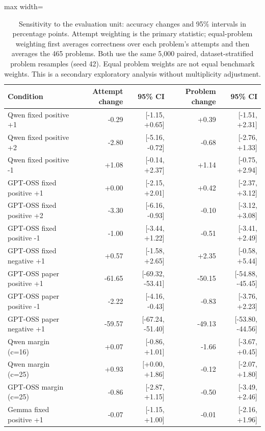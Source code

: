 \documentclass[12pt,a4paper,twoside,openright]{book}
\begin{document}
\begin{table}[!ht]
\centering\small
\caption{Sensitivity to the evaluation unit: accuracy changes and 95\% intervals in percentage points. Attempt weighting is the primary statistic; equal-problem weighting first averages correctness over each problem's attempts and then averages the 465 problems. Both use the same 5,000 paired, dataset-stratified problem resamples (seed 42). Equal problem weights are not equal benchmark weights. This is a secondary exploratory analysis without multiplicity adjustment.}
\label{tab:res-weighting}
\begin{adjustbox}{max width=\linewidth}%
\begin{tabular}{lrrrr}
\toprule
Condition & Attempt change & 95\% CI & Problem change & 95\% CI \\
\midrule
Qwen fixed positive +1 & -0.29 & [-1.15, +0.65] & +0.39 & [-1.51, +2.31] \\
Qwen fixed positive +2 & -2.80 & [-5.16, -0.72] & -0.68 & [-2.76, +1.33] \\
Qwen fixed positive -1 & +1.08 & [-0.14, +2.37] & +1.14 & [-0.75, +2.94] \\
GPT-OSS fixed positive +1 & +0.00 & [-2.15, +2.01] & +0.42 & [-2.37, +3.12] \\
GPT-OSS fixed positive +2 & -3.30 & [-6.16, -0.93] & -0.10 & [-3.12, +3.08] \\
GPT-OSS fixed positive -1 & -1.00 & [-3.44, +1.22] & -0.51 & [-3.41, +2.49] \\
GPT-OSS fixed negative +1 & +0.57 & [-1.58, +2.65] & +2.35 & [-0.58, +5.44] \\
GPT-OSS paper positive +1 & -61.65 & [-69.32, -53.41] & -50.15 & [-54.88, -45.45] \\
GPT-OSS paper positive -1 & -2.22 & [-4.16, -0.43] & -0.83 & [-3.76, +2.23] \\
GPT-OSS paper negative +1 & -59.57 & [-67.24, -51.40] & -49.13 & [-53.80, -44.56] \\
Qwen margin (c=16) & +0.07 & [-0.86, +1.01] & -1.66 & [-3.67, +0.45] \\
Qwen margin (c=25) & +0.93 & [+0.00, +1.86] & -0.12 & [-2.07, +1.80] \\
GPT-OSS margin (c=25) & -0.86 & [-2.87, +1.15] & -0.50 & [-3.49, +2.46] \\
Gemma fixed positive +1 & -0.07 & [-1.15, +1.00] & -0.01 & [-2.16, +1.96] \\
\bottomrule
\end{tabular}
\end{adjustbox}
\end{table}
\end{document}
